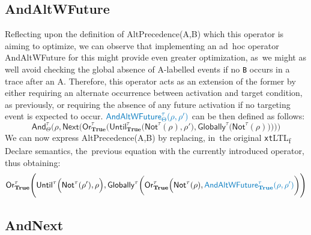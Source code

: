 \documentclass[information,article,accept,pdftex,oneauthor]{Definitions/mdpi}
\begin{document}
\subsection{AndAltWFuture} 


Reflecting upon the definition of \textsf{AltPrecedence\-(A,B)} which this operator is aiming to optimize, we can observe that implementing an ad~hoc operator AndAltWFuture for this might provide even greater optimization, as~we might as well avoid checking the global absence of \textsf{A}-labelled events if no \texttt{B} occurs in a trace after an \textsf{A}. Therefore, this operator acts as an extension of the former by either requiring an alternate occurrence between activation and target condition, as previously, or requiring the absence of any future activation if no targeting event is expected to occur. $\color{oceanboatblue}\textsf{AndAltWFuture}^\tau_\Theta(\rho,\rho')$ can be then defined as follows:
\begin{equation}\label{AAW}
\textsf{And}^\tau_\Theta\Bigg(\rho,\textsf{Next}\bigg(\textsf{Or}^\tau_\textbf{True}\Big(\textsf{Until}^\tau_\textbf{True}\big(\textsf{Not}^\tau(\rho),\rho'\big),\textsf{Globally}^\tau\big(\textsf{Not}^\tau(\rho)\big)\Big)\bigg)\Bigg)
\end{equation}
We can now express \textsf{AltPrecedence(A,B)} by replacing, in~the original \texttt{xt}LTL\textsubscript{f} Declare semantics, the~previous equation with the currently introduced operator, thus obtaining:
\begin{equation}\label{qp2}
    \begin{split}
\textsf{Or}^\tau_{\textbf{True}}\Bigg(&\textsf{Until}^\tau\Big(\textsf{Not}^\tau(\rho'),\rho\Big),\textsf{Globally}^\tau\bigg(\textsf{Or}^\tau_\textbf{True}\Big(\textsf{Not}^\tau(\rho),{\color{oceanboatblue}\textsf{AndAltWFuture}^{\tau}_{\textbf{True}}(\rho,\rho')}\bigg)\Bigg)\\
\end{split}
\end{equation}


\subsection{AndNext} 
\end{document}
